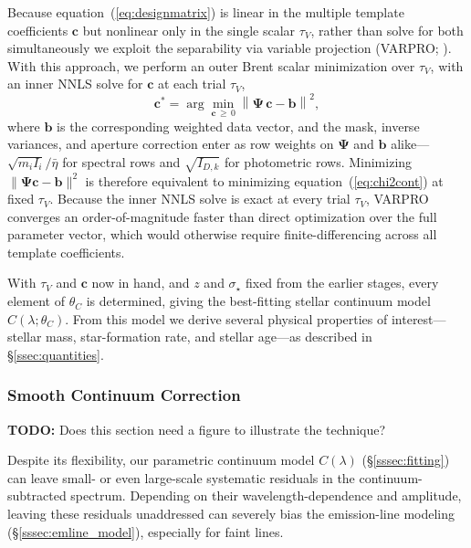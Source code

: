 \documentclass[modern,linenumbers]{aastex701}
\newcommand{\todo}[1]{{\color{red}\textbf{TODO:} #1}}
\newcommand{\vdisp}{\ensuremath{\sigma_\star}}
\newcommand{\tauv}{\ensuremath{\tau_V}}
\begin{document}
Because equation~(\ref{eq:designmatrix}) is linear in the multiple
template coefficients $\mathbf{c}$ but nonlinear only in the single
scalar $\tauv$, rather than solve for both simultaneously we exploit
the separability via variable projection (VARPRO; \citealt{golub73a}).
With this approach, we perform an outer Brent scalar minimization over
$\tauv$, with an inner NNLS solve for $\mathbf{c}$ at each trial
$\tauv$,
\begin{equation}
  \mathbf{c}^* = \arg\min_{\mathbf{c}\,\geq\,0}
  \left\|\boldsymbol{\Psi}\,\mathbf{c} - \mathbf{b}\right\|^2,
  \label{eq:nnls}
\end{equation}
where $\mathbf{b}$ is the corresponding weighted data vector, and the
mask, inverse variances, and aperture correction enter as row weights
on $\boldsymbol{\Psi}$ and $\mathbf{b}$ alike---$\sqrt{m_i I_i}/\bar\eta$
for spectral rows and $\sqrt{I_{D,k}}$ for photometric rows. Minimizing
$\|\boldsymbol{\Psi}\mathbf{c}-\mathbf{b}\|^2$ is therefore equivalent
to minimizing equation~(\ref{eq:chi2cont}) at fixed $\tauv$. Because
the inner NNLS solve is exact at every trial $\tauv$, VARPRO converges
an order-of-magnitude faster than direct optimization over the full
parameter vector, which would otherwise require finite-differencing
across all template coefficients.

With $\tauv$ and $\mathbf{c}$ now in hand, and $z$ and $\vdisp$ fixed
from the earlier stages, every element of $\theta_C$ is determined,
giving the best-fitting stellar continuum model
$C(\lambda;\theta_C)$. From this model we derive several physical
properties of interest---stellar mass, star-formation rate, and
stellar age---as described in \S\ref{ssec:quantities}.

\subsubsection{Smooth Continuum Correction}
\label{sssec:smooth}

\todo{Does this section need a figure to illustrate the technique?}

Despite its flexibility, our parametric continuum model $C(\lambda)$
(\S\ref{sssec:fitting}) can leave small- or even large-scale
systematic residuals in the continuum-subtracted spectrum. Depending
on their wavelength-dependence and amplitude, leaving these residuals
unaddressed can severely bias the emission-line modeling
(\S\ref{sssec:emline_model}), especially for faint lines.
\end{document}
